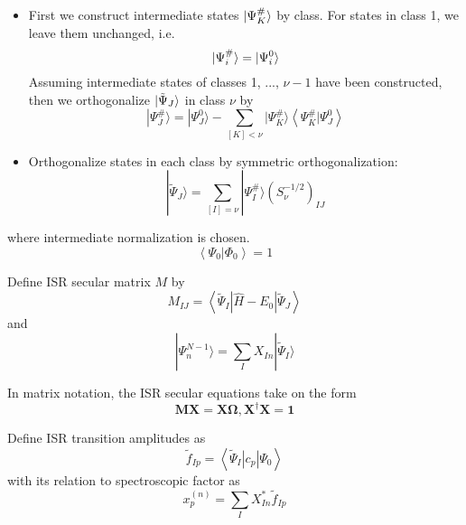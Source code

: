 \begin{itemize}
	\item First we construct intermediate states $\ket{\Psi^{\#}_K}$ by class. For states in class 1, we leave them unchanged, i.e.
		\begin{equation}
			\ket{\Psi^{\#}_i}=\ket{\Psi^0_i}
		\end{equation}
		Assuming intermediate states of classes 1, ..., $\nu-1$ have been constructed, then we orthogonalize $\ket{\tilde{\Psi}_J}$ in class $\nu$ by
		\begin{equation}
			| \Psi_{J}^{\#} \rangle=| \Psi_{J}^{0} \rangle-\sum_{[K]<\nu} | \Psi^{\#}_{K} \rangle\left\langle\Psi^{\#}_{K} | \Psi_{J}^{0}\right\rangle
		\end{equation}
	\item Orthogonalize states in each class by symmetric orthogonalization:
		\begin{equation}
			| \tilde{\Psi}_{J} \rangle=\sum_{[I]=\nu} | \Psi_{I}^{\#} \rangle\left(S_{\nu}^{-1 / 2}\right)_{I J}
		\end{equation}
\end{itemize}
where intermediate normalization is chosen.
\begin{equation}
	\left\langle\Psi_{0} | \Phi_{0}\right\rangle= 1
\end{equation}

Define ISR secular matrix $M$ by
\begin{equation}
	M_{I J}=\left\langle\tilde{\Psi}_{I}\left|\hat{H}-E_{0}\right| \tilde{\Psi}_{J}\right\rangle
\end{equation}
and 
\begin{equation}
	| \Psi_{n}^{N-1} \rangle=\sum_{I} X_{I n} | \tilde{\Psi}_{I} \rangle
\end{equation}

In matrix notation, the ISR secular equations take on the form
\begin{equation}
	\boldsymbol{M X}=\boldsymbol{X} \boldsymbol{\Omega}, \boldsymbol{X}^{\dagger} \boldsymbol{X}=\mathbf{1}
\end{equation}

Define ISR transition amplitudes as
\begin{equation}
	\tilde{f}_{I p}=\left\langle\tilde{\Psi}_{I}\left|c_{p}\right| \Psi_{0}\right\rangle
\end{equation}
with its relation to spectroscopic factor as
\begin{equation}
	x_{p}^{(n)}=\sum_{I} X_{I n}^{*} \tilde{f}_{I p}
\end{equation}

